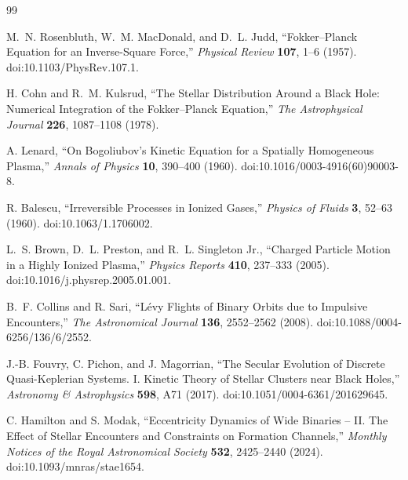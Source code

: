 \documentclass[11pt]{article}
\theoremstyle{remark}
\newcommand{\1}{\mathbf 1}
\begin{document}
\begin{thebibliography}{99}

M.~N. Rosenbluth, W.~M. MacDonald, and D.~L. Judd,
``Fokker--Planck Equation for an Inverse-Square Force,''
\emph{Physical Review} \textbf{107}, 1--6 (1957).
doi:10.1103/PhysRev.107.1.

H. Cohn and R.~M. Kulsrud,
``The Stellar Distribution Around a Black Hole: Numerical Integration of the
Fokker--Planck Equation,''
\emph{The Astrophysical Journal} \textbf{226}, 1087--1108 (1978).

A. Lenard,
``On Bogoliubov's Kinetic Equation for a Spatially Homogeneous Plasma,''
\emph{Annals of Physics} \textbf{10}, 390--400 (1960).
doi:10.1016/0003-4916(60)90003-8.

R. Balescu,
``Irreversible Processes in Ionized Gases,''
\emph{Physics of Fluids} \textbf{3}, 52--63 (1960).
doi:10.1063/1.1706002.

L.~S. Brown, D.~L. Preston, and R.~L. Singleton Jr.,
``Charged Particle Motion in a Highly Ionized Plasma,''
\emph{Physics Reports} \textbf{410}, 237--333 (2005).
doi:10.1016/j.physrep.2005.01.001.

B.~F. Collins and R. Sari,
``L\'evy Flights of Binary Orbits due to Impulsive Encounters,''
\emph{The Astronomical Journal} \textbf{136}, 2552--2562 (2008).
doi:10.1088/0004-6256/136/6/2552.

J.-B. Fouvry, C. Pichon, and J. Magorrian,
``The Secular Evolution of Discrete Quasi-Keplerian Systems. I. Kinetic
Theory of Stellar Clusters near Black Holes,''
\emph{Astronomy \& Astrophysics} \textbf{598}, A71 (2017).
doi:10.1051/0004-6361/201629645.

C. Hamilton and S. Modak,
``Eccentricity Dynamics of Wide Binaries -- II. The Effect of Stellar
Encounters and Constraints on Formation Channels,''
\emph{Monthly Notices of the Royal Astronomical Society}
\textbf{532}, 2425--2440 (2024).
doi:10.1093/mnras/stae1654.

\end{thebibliography}
\end{document}
